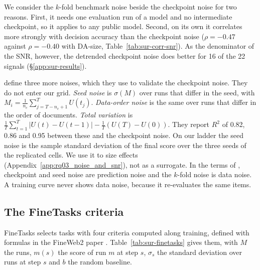 We consider the $k$-fold benchmark noise beside the checkpoint noise for two reasons. First, it needs one evaluation run of a model and no intermediate checkpoint, so it applies to any public model. Second, on its own it correlates more strongly with decision accuracy than the checkpoint noise ($\rho = -0.47$ against $\rho = -0.40$ with DA-size, Table~\ref{tab:sur-corr-snr}). As the denominator of the SNR, however, the detrended checkpoint noise does better for 16 of the 22 signals (\S\ref{app:sur-results}).

\citet{heineman_signal_2025} define three more noises, which they use to validate the checkpoint noise. They do not enter our grid.
\emph{Seed noise} is $\sigma(M)$ over runs that differ in the seed, with $M_i = \frac{1}{n_c}\sum_{j=T-n_c+1}^{T} U(t_j)$. \emph{Data-order noise} is the same over runs that differ in the order of documents.
\emph{Total variation} is $\frac{1}{T}\sum_{t=1}^{T}|U(t) - U(t-1)| - \frac{1}{T}(U(T) - U(0))$.
They report $R^2$ of 0.82, 0.86 and 0.95 between these and the checkpoint noise.
On our ladder the seed noise is the sample standard deviation of the final score over the three seeds of the replicated cells. We use it to size effects (Appendix~\ref{app:rq03_noise_and_snr}), not as a surrogate.
In the terms of \citet{wang_measuring_2025}, checkpoint and seed noise are prediction noise and the $k$-fold noise is data noise. A training curve never shows data noise, because it re-evaluates the same items.

\subsection{The FineTasks criteria}
\label{app:sur-finetasks}

FineTasks \citep{kydlicek_finetasks_nodate} selects tasks with four criteria computed along training, defined with formulas in the FineWeb2 paper \citep{penedo_fineweb2_2025}.
Table~\ref{tab:sur-finetasks} gives them, with $M$ the runs, $m(s)$ the score of run $m$ at step $s$, $\sigma_s$ the standard deviation over runs at step $s$ and $b$ the random baseline.

